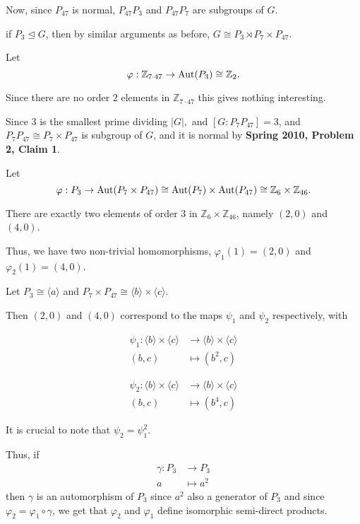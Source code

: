 \documentclass[12pt]{AlgebraQual}
\begin{document}
\begin{solution}
Now, since $P_{47}$ is normal, $P_{47}P_3$ and $P_{47}P_7$ are subgroups of $G$.

 if $P_3\trianglelefteq G$, then by similar arguments as before, $G\cong P_3\rtimes P_7\times P_{47}$.

Let $$\varphi:\mathbb{Z}_{7\cdot 47}\to\text{Aut}(P_3)\cong\mathbb{Z}_2.$$

Since there are no order $2$ elements in $\mathbb{Z}_{7\cdot 47}$ this gives nothing interesting.

 Since $3$ is the smallest prime dividing $|G|,$ and $[G:P_7P_{47}]=3$, and $P_7P_{47}\cong P_7\times P_{47}$ is subgroup of $G$, and it is normal by \textbf{Spring 2010, Problem 2, Claim 1}.

Let $$\varphi:P_3\to \text{Aut}(P_7\times P_{47})\cong \text{Aut}(P_7)\times\text{Aut}(P_{47})\cong\mathbb{Z}_6\times\mathbb{Z}_{46}.$$

There are exactly two elements of order $3$ in $\mathbb{Z}_6\times\mathbb{Z}_{46}$, namely $(2,0)$ and $(4,0)$.

Thus, we have two non-trivial homomorphisms, $\varphi_1(1)=(2,0)$ and $\varphi_2(1)=(4,0)$.

Let $P_3\cong\langle a\rangle$ and $P_7\times P_{47}\cong \langle b\rangle\times\langle c\rangle$.

Then $(2,0)$ and $(4,0)$ correspond to the maps $\psi_1$ and $\psi_2$ respectively, with
\begin{center}
\begin{minipage}{0.4\textwidth}
\begin{align*}
    \psi_1: \langle b\rangle\times\langle c\rangle&\to \langle b\rangle\times\langle c\rangle\\
    (b,c)&\mapsto (b^2,c)
\end{align*}
\end{minipage}
\begin{minipage}{0.4\textwidth}
\begin{align*}
    \psi_2: \langle b\rangle\times\langle c\rangle&\to \langle b\rangle\times\langle c\rangle\\
    (b,c)&\mapsto (b^4,c)
\end{align*}
\end{minipage}
\end{center}

It is crucial to note that $\psi_2=\psi_1^2$.

Thus, if \begin{align*}
    \gamma:P_3&\to P_3\\
    a&\mapsto a^2
\end{align*} then $\gamma$ is an automorphism of $P_3$ since $a^2$ also a generator of $P_3$ and since $\varphi_2=\varphi_1\circ\gamma$, we get that $\varphi_2$ and $\varphi_1$ define isomorphic semi-direct products.


\end{solution}
\end{document}

